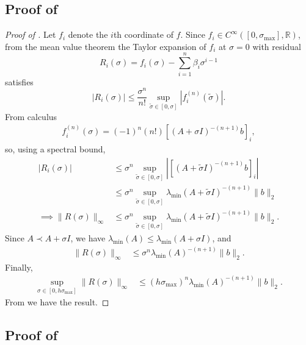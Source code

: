 \documentclass[10pt]{article} %
\begin{document}
\subsection{Proof of }
\label{app: proof extrap error}

\begin{proof}[Proof of ]
Let $f_i$ denote the $i$th coordinate of $f$.
Since $f_i \in C^\infty([0,\sigma_{\max}],\mathbb{R})$, from the mean value theorem the Taylor expansion of $f_i$ at $\sigma = 0$ with residual
$$
R_i(\sigma) = f_i(\sigma) - \sum_{ i = 1 }^n \beta_i \sigma^{i-1} 
$$
satisfies 
$$
|R_i(\sigma)| \leq \frac{\sigma^{n}}{n!} \sup_{\tilde{\sigma} \in [0,\sigma]} | f_i^{(n)}(\tilde{\sigma}) |  .
$$
From calculus
\begin{align*}
    f_i^{(n)}(\sigma) = (-1)^n (n!) [ (A + \sigma I)^{-(n+1)} b ]_i ,
\end{align*}
so, using a spectral bound,
\begin{align*}
| R_i(\sigma) | & \leq \sigma^{n} \sup_{ \tilde{\sigma} \in [0,\sigma]} |  [ (A + \tilde{\sigma} I)^{-(n+1)} b ]_i | \\
& \leq \sigma^n \sup_{ \tilde{\sigma} \in [0,\sigma]} \lambda_{\min}(A + \tilde{\sigma} I)^{-(n+1)}  \|b\|_2 \\
\implies \| R(\sigma) \|_\infty & \leq \sigma^n \sup_{ \tilde{\sigma} \in [0,\sigma]} \lambda_{\min}(A + \tilde{\sigma} I)^{-(n+1)} \|b\|_2 .
\end{align*}
Since $A \prec A + \sigma I$, we have $\lambda_{\min}(A) \leq \lambda_{\min}(A + \sigma I)$, and
\begin{align*}
\| R(\sigma) \|_\infty & \leq \sigma^n \lambda_{\min}(A)^{-(n+1)} \|b\|_2 .
\end{align*}
Finally,
\begin{align*}
\sup_{\sigma \in [0,h\sigma_{\max}]} \|R(\sigma)\|_\infty & \leq (h \sigma_{\max})^n \lambda_{\min}(A)^{-(n+1)} \|b\|_2  .
\end{align*}
From  we have the result.
\end{proof}



\subsection{Proof of }
\label{app: numerical proof}
\end{document}
